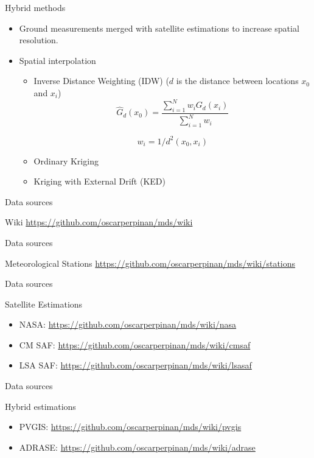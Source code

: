 \documentclass[xcolor={usenames,svgnames,dvipsnames}]{beamer}
\begin{document}
\begin{frame}[label={sec:org30a4df4}]{Hybrid methods}
\begin{itemize}
\item Ground measurements merged with satellite estimations to increase spatial resolution.
\item Spatial interpolation
\begin{itemize}
\item \alert{Inverse Distance Weighting (IDW)} (\(d\) is the distance between locations \(x_0\) and \(x_i\))
\[
\widehat{G}_d(x_0) = \frac{\sum_{i=1}^N w_i G_{d}(x_i)}{\sum_{i=1}^N w_i} 
\]

\[
  w_i = 1/d^2(x_0, x_i)
\]
\item \alert{Ordinary Kriging}
\item \alert{Kriging with External Drift (KED)}
\end{itemize}
\end{itemize}
\end{frame}

\begin{frame}[label={sec:org3f4b6aa}]{Data sources}
\begin{block}{Wiki}
\url{https://github.com/oscarperpinan/mds/wiki}
\end{block}
\end{frame}

\begin{frame}[label={sec:orgeebdc20}]{Data sources}
\begin{block}{Meteorological Stations}
\url{https://github.com/oscarperpinan/mds/wiki/stations}
\end{block}
\end{frame}

\begin{frame}[label={sec:org045456c}]{Data sources}
\begin{block}{Satellite Estimations}
\begin{itemize}
\item NASA: \url{https://github.com/oscarperpinan/mds/wiki/nasa}
\item CM SAF: \url{https://github.com/oscarperpinan/mds/wiki/cmsaf}
\item LSA SAF: \url{https://github.com/oscarperpinan/mds/wiki/lsasaf}
\end{itemize}
\end{block}
\end{frame}

\begin{frame}[label={sec:org04adb32}]{Data sources}
\begin{block}{Hybrid estimations}
\begin{itemize}
\item PVGIS: \url{https://github.com/oscarperpinan/mds/wiki/pvgis}
\item ADRASE: \url{https://github.com/oscarperpinan/mds/wiki/adrase}
\end{itemize}
\end{block}
\end{frame}
\end{document}
